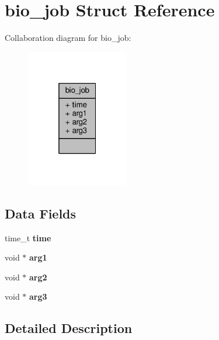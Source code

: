 \hypertarget{structbio__job}{}\section{bio\+\_\+job Struct Reference}
\label{structbio__job}


Collaboration diagram for bio\+\_\+job\+:\nopagebreak
\begin{figure}[H]
\begin{center}
\leavevmode
\includegraphics[width=127pt]{structbio__job__coll__graph}
\end{center}
\end{figure}
\subsection*{Data Fields}
\begin{DoxyCompactItemize}
\item 
\mbox{\label{structbio__job_a53ba1f8a9fbb41c152e809f9839822f4}} 
time\+\_\+t {\bfseries time}
\item 
\mbox{\label{structbio__job_a82f24d16132c2abb05e738c3a84fede2}} 
void $\ast$ {\bfseries arg1}
\item 
\mbox{\label{structbio__job_ad2c73641a7fdc6ecc59a7a653570e7a1}} 
void $\ast$ {\bfseries arg2}
\item 
\mbox{\label{structbio__job_aff4785b5f684214e4fe1ddeb8b61c63d}} 
void $\ast$ {\bfseries arg3}
\end{DoxyCompactItemize}


\subsection{Detailed Description}


